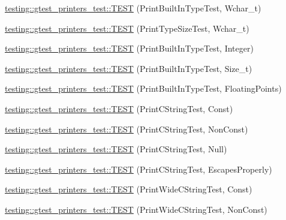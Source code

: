 \begin{DoxyCompactItemize}
\item 
\hyperlink{namespacetesting_1_1gtest__printers__test_ab567ebd97eff0a4b9a20a5f5cb77d678}{testing\+::gtest\+\_\+printers\+\_\+test\+::\+T\+E\+S\+T} (Print\+Built\+In\+Type\+Test, Wchar\+\_\+t)
\item 
\hyperlink{namespacetesting_1_1gtest__printers__test_a705ec4c2886606a22194107397fceea6}{testing\+::gtest\+\_\+printers\+\_\+test\+::\+T\+E\+S\+T} (Print\+Type\+Size\+Test, Wchar\+\_\+t)
\item 
\hyperlink{namespacetesting_1_1gtest__printers__test_a278d53e99390c7b31ff531524fe5e86e}{testing\+::gtest\+\_\+printers\+\_\+test\+::\+T\+E\+S\+T} (Print\+Built\+In\+Type\+Test, Integer)
\item 
\hyperlink{namespacetesting_1_1gtest__printers__test_a991dc124d153742c3ca126b2fa9ccab5}{testing\+::gtest\+\_\+printers\+\_\+test\+::\+T\+E\+S\+T} (Print\+Built\+In\+Type\+Test, Size\+\_\+t)
\item 
\hyperlink{namespacetesting_1_1gtest__printers__test_acde0b28d177604ddb5e185d7b107f6f7}{testing\+::gtest\+\_\+printers\+\_\+test\+::\+T\+E\+S\+T} (Print\+Built\+In\+Type\+Test, Floating\+Points)
\item 
\hyperlink{namespacetesting_1_1gtest__printers__test_a6cd47b21ad8d9ac66ba57b5b6415a924}{testing\+::gtest\+\_\+printers\+\_\+test\+::\+T\+E\+S\+T} (Print\+C\+String\+Test, Const)
\item 
\hyperlink{namespacetesting_1_1gtest__printers__test_a89d9905fecee1b976c26d35498734dd4}{testing\+::gtest\+\_\+printers\+\_\+test\+::\+T\+E\+S\+T} (Print\+C\+String\+Test, Non\+Const)
\item 
\hyperlink{namespacetesting_1_1gtest__printers__test_ad29b97d58a4d1e5e8dd4d854f66b9e22}{testing\+::gtest\+\_\+printers\+\_\+test\+::\+T\+E\+S\+T} (Print\+C\+String\+Test, Null)
\item 
\hyperlink{namespacetesting_1_1gtest__printers__test_a140030b990011abab91d4c0b59f21edd}{testing\+::gtest\+\_\+printers\+\_\+test\+::\+T\+E\+S\+T} (Print\+C\+String\+Test, Escapes\+Properly)
\item 
\hyperlink{namespacetesting_1_1gtest__printers__test_a4caa1f81979cdc6f5ada95e01a4fae63}{testing\+::gtest\+\_\+printers\+\_\+test\+::\+T\+E\+S\+T} (Print\+Wide\+C\+String\+Test, Const)
\item 
\hyperlink{namespacetesting_1_1gtest__printers__test_a8812b5f088e13083ebb8a7e35fbcdae7}{testing\+::gtest\+\_\+printers\+\_\+test\+::\+T\+E\+S\+T} (Print\+Wide\+C\+String\+Test, Non\+Const)
\item 

\end{DoxyCompactItemize}

